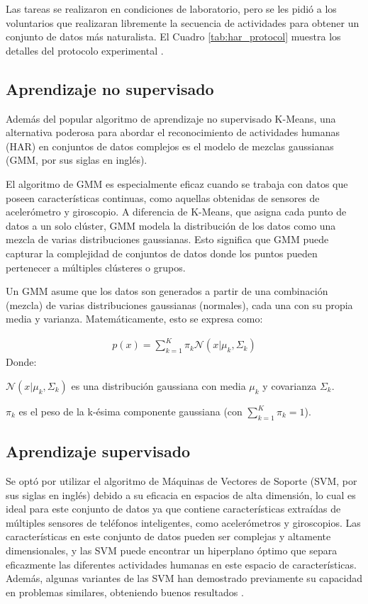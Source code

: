 \documentclass{esannV2}
\begin{document}
Las tareas se realizaron en condiciones de laboratorio, pero se les pidió a los voluntarios que realizaran libremente la secuencia de actividades para obtener un conjunto de datos más naturalista. El Cuadro \ref{tab:har_protocol} muestra los detalles del protocolo experimental \cite{esann2013}.

\subsection{Aprendizaje no supervisado}
Además del popular algoritmo de aprendizaje no supervisado K-Means, una alternativa poderosa para abordar el reconocimiento de actividades humanas (HAR) en conjuntos de datos complejos es el modelo de mezclas gaussianas (GMM, por sus siglas en inglés).

El algoritmo de GMM es especialmente eficaz cuando se trabaja con datos que poseen características continuas, como aquellas obtenidas de sensores de acelerómetro y giroscopio. A diferencia de K-Means, que asigna cada punto de datos a un solo clúster, GMM modela la distribución de los datos como una mezcla de varias distribuciones gaussianas. Esto significa que GMM puede capturar la complejidad de conjuntos de datos donde los puntos pueden pertenecer a múltiples clústeres o grupos.

Un GMM asume que los datos son generados a partir de una combinación (mezcla) de varias distribuciones gaussianas (normales), cada una con su propia media y varianza. Matemáticamente, esto se expresa como:

\begin{eqnarray}
p(x) = \sum_{k=1}^{K} \pi_{k} \mathcal{N}(x | \mu_{k}, \Sigma_{k})
\end{eqnarray}
Donde:

$\mathcal{N}(x | \mu_{k}, \Sigma_{k})$ es una distribución gaussiana con media $\mu_{k}$ y covarianza $\Sigma_{k}$.


$\pi_{k}$ es el peso de la k-ésima componente gaussiana (con $\sum_{k=1}^{K} \pi_{k} = 1$).


\subsection{Aprendizaje supervisado}
Se optó por utilizar el algoritmo de Máquinas de Vectores de Soporte (SVM, por sus siglas en inglés) debido a su eficacia en espacios de alta dimensión, lo cual es ideal para este conjunto de datos ya que contiene características extraídas de múltiples sensores de teléfonos inteligentes, como acelerómetros y giroscopios. Las características en este conjunto de datos pueden ser complejas y altamente dimensionales, y las SVM puede encontrar un hiperplano óptimo que separa eficazmente las diferentes actividades humanas en este espacio de características. Además, algunas variantes de las SVM han demostrado previamente su capacidad en problemas similares, obteniendo buenos resultados \cite{anguitaSVM}.
\end{document}

